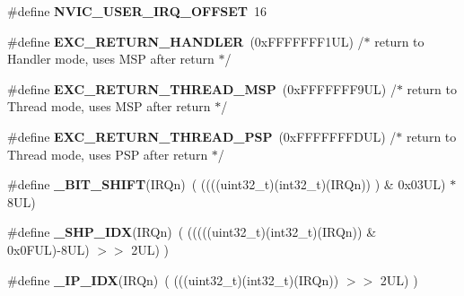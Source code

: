\begin{DoxyCompactItemize}
\#define {\bfseries N\+V\+I\+C\+\_\+\+U\+S\+E\+R\+\_\+\+I\+R\+Q\+\_\+\+O\+F\+F\+S\+ET}~16
\item 
\mbox{\label{group___c_m_s_i_s___core___n_v_i_c_functions_gaa6fa2b10f756385433e08522d9e4632f}} 
\#define {\bfseries E\+X\+C\+\_\+\+R\+E\+T\+U\+R\+N\+\_\+\+H\+A\+N\+D\+L\+ER}~(0x\+F\+F\+F\+F\+F\+F\+F1\+U\+L)     /$\ast$ return to Handler mode, uses M\+S\+P after return                               $\ast$/
\item 
\mbox{\label{group___c_m_s_i_s___core___n_v_i_c_functions_gaea4703101b5e679f695e231f7ee72331}} 
\#define {\bfseries E\+X\+C\+\_\+\+R\+E\+T\+U\+R\+N\+\_\+\+T\+H\+R\+E\+A\+D\+\_\+\+M\+SP}~(0x\+F\+F\+F\+F\+F\+F\+F9\+U\+L)     /$\ast$ return to Thread mode, uses M\+S\+P after return                                $\ast$/
\item 
\mbox{\label{group___c_m_s_i_s___core___n_v_i_c_functions_ga9998daf0fbdf31dbc8f81cd604b58175}} 
\#define {\bfseries E\+X\+C\+\_\+\+R\+E\+T\+U\+R\+N\+\_\+\+T\+H\+R\+E\+A\+D\+\_\+\+P\+SP}~(0x\+F\+F\+F\+F\+F\+F\+F\+D\+U\+L)     /$\ast$ return to Thread mode, uses P\+S\+P after return                                $\ast$/
\item 
\mbox{\label{group___c_m_s_i_s___core___n_v_i_c_functions_ga53c75b28823441c6153269f0ecbed878}} 
\#define {\bfseries \+\_\+\+B\+I\+T\+\_\+\+S\+H\+I\+FT}(I\+R\+Qn)~(  ((((uint32\+\_\+t)(int32\+\_\+t)(I\+R\+Qn))         )      \&  0x03\+U\+L) $\ast$ 8\+U\+L)
\item 
\mbox{\label{group___c_m_s_i_s___core___n_v_i_c_functions_gaee4f7eb5d7e770ad51489dbceabb1755}} 
\#define {\bfseries \+\_\+\+S\+H\+P\+\_\+\+I\+DX}(I\+R\+Qn)~( (((((uint32\+\_\+t)(int32\+\_\+t)(I\+R\+Qn)) \& 0x0\+F\+U\+L)-\/8\+U\+L) $>$$>$    2\+U\+L)      )
\item 
\mbox{\label{group___c_m_s_i_s___core___n_v_i_c_functions_ga370ec4b1751a6a889d849747df3763a9}} 
\#define {\bfseries \+\_\+\+I\+P\+\_\+\+I\+DX}(I\+R\+Qn)~(   (((uint32\+\_\+t)(int32\+\_\+t)(I\+R\+Qn))                $>$$>$    2\+U\+L)      )

\end{DoxyCompactItemize}
